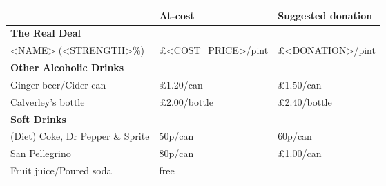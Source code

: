 \documentclass[a4paper,12pt]{article}
\begin{document}
\large
\begin{center}

\def\arraystretch{1.1}

\begin{tabular}{p{7.5cm}p{3cm}p{3cm}} & \textbf{At-cost} & \textbf{Suggested donation} \\
\hline

\textbf{The Real Deal} & & \\
<NAME> (<STRENGTH>\%) & \pounds <COST_PRICE>/pint & \pounds <DONATION>/pint \\
\medskip



\textbf{Other Alcoholic Drinks} & & \\
Ginger beer/Cider can & \pounds 1.20/can & \pounds 1.50/can \\
Calverley's bottle & \pounds 2.00/bottle & \pounds 2.40/bottle \\
\medskip

\textbf{Soft Drinks} &&\\
(Diet) Coke, Dr Pepper \& Sprite & 50p/can  & 60p/can \\
San Pellegrino & 80p/can & \pounds 1.00/can \\
Fruit juice/Poured soda & free \\ %


\end{tabular}
\end{center}
\end{document}
